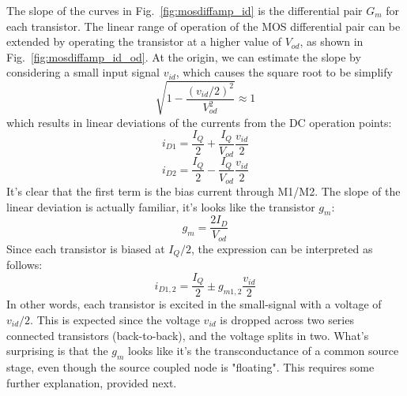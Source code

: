 The slope of the curves in Fig.~\ref{fig:mosdiffamp_id} is the differential pair $G_m$ for each transistor.   The linear range of operation of the MOS differential pair can be extended by operating the transistor at a higher value of $V_{od}$, as shown in Fig.~\ref{fig:mosdiffamp_id_od}.   At the origin, we can estimate the slope by considering a small input signal $v_{id}$, which causes the square root to be simplify
    \begin{equation} 
        \sqrt {1 - \frac{{{{({v_{id}}/2)}^2}}}{{V_{od}^2}}}  \approx 1
    \end{equation}
which results in linear deviations of the currents from the DC operation points:
    \begin{equation} 
        {i_{D1}} = \frac{I_Q}{2} + \frac{I_Q}{{{V_{od}}}}\frac{{{v_{id}}}}{2} 
    \end{equation}
    \begin{equation} 
        {i_{D2}} = \frac{I_Q}{2} - \frac{I_Q}{{{V_{od}}}}\frac{{{v_{id}}}}{2}
    \end{equation}
It's clear that the first term is the bias current through M1/M2.  The slope of the linear deviation is actually familiar, it's looks like the transistor $g_m$:
    \begin{equation}
        g_m = \frac{2 I_D}{V_{od}}
    \end{equation}
Since each transistor is biased at $I_Q/2$, the expression can be interpreted as follows:
    \begin{equation} 
        {i_{D1,2}} = \frac{I_Q}{2} \pm g_{m1,2} \frac{{{v_{id}}}}{2}
    \end{equation}
In other words, each transistor is excited in the small-signal with a voltage of $v_{id}/2$.  This is expected since the voltage $v_{id}$ is dropped across two series connected transistors (back-to-back), and the voltage splits in two.  What's surprising is that the $g_m$ looks like it's the transconductance of a common source stage, even though the source coupled node is "floating".  This requires some further explanation, provided next.
